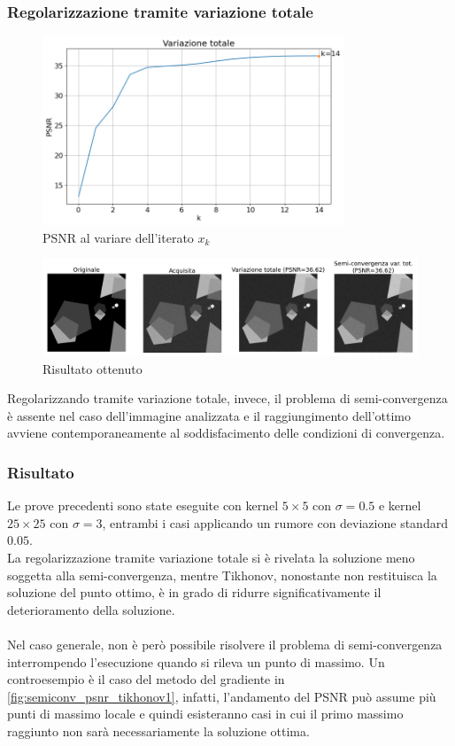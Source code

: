 \documentclass[11pt]{article}
\begin{document}
\subsubsection{Regolarizzazione tramite variazione totale}
\begin{figure}[H]
    \centering
    \includegraphics[width=9cm]{semiconvergenza/1/psnr_tv.png}
    \caption{PSNR al variare dell'iterato $x_k$}
    \label{fig:semiconv_psnr_tv1}
\end{figure}
\begin{figure}[H]
    \centering
    \includegraphics[width=15cm]{semiconvergenza/1/deblur_tv.png}
    \caption{Risultato ottenuto}
    \label{fig:semiconv_deblur_tv1}
\end{figure}
Regolarizzando tramite variazione totale, invece, il problema di semi-convergenza è assente nel caso dell'immagine analizzata e il raggiungimento dell'ottimo avviene contemporaneamente al soddisfacimento delle condizioni di convergenza.

\subsubsection{Risultato}
Le prove precedenti sono state eseguite con kernel $5 \times 5$ con $\sigma=0.5$ e kernel $25 \times 25$ con $\sigma=3$, entrambi i casi applicando un rumore con deviazione standard $0.05$.\\
La regolarizzazione tramite variazione totale si è rivelata la soluzione meno soggetta alla semi-convergenza, mentre Tikhonov, nonostante non restituisca la soluzione del punto ottimo, è in grado di ridurre significativamente il deterioramento della soluzione.\\~\\
Nel caso generale, non è però possibile risolvere il problema di semi-convergenza interrompendo l'esecuzione quando si rileva un punto di massimo. 
Un controesempio è il caso del metodo del gradiente in \autoref{fig:semiconv_psnr_tikhonov1}, infatti, l'andamento del PSNR può assume più punti di massimo locale e quindi esisteranno casi in cui il primo massimo raggiunto non sarà necessariamente la soluzione ottima.
\end{document}
